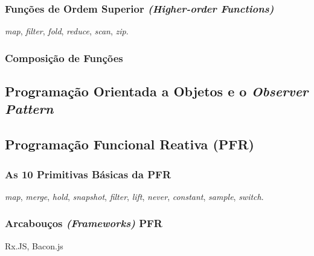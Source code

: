\subsubsection{Funções de Ordem Superior \emph{(Higher-order Functions)}}

\emph{map}, \emph{filter}, \emph{fold}, \emph{reduce}, \emph{scan}, \emph{zip}.

\subsubsection{Composição de Funções}

%

\subsection{Programação Orientada a Objetos e o \emph{Observer Pattern}}


\subsection{Programação Funcional Reativa (PFR)}
\label{sec:pfr}




\subsubsection{As 10 Primitivas Básicas da PFR}
\label{sec:pfr-10-primitivas}

\emph{map}, \emph{merge}, \emph{hold}, \emph{snapshot}, \emph{filter},
\emph{lift}, \emph{never}, \emph{constant}, \emph{sample}, \emph{switch}.


\subsubsection{Arcabouços \emph{(Frameworks)} PFR}
\label{sec:pfr-frameworks}

Rx.JS, Bacon.js

